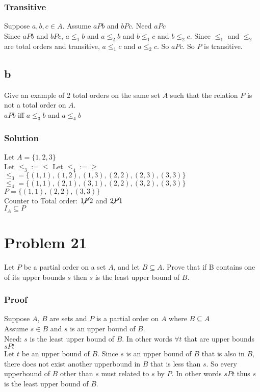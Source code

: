 \documentclass{article}
\begin{document}
\subsubsection*{Transitive}
Suppose $a,b,c \in A$.
Assume $aPb$ and $bPc$.
Need $aPc$\\
Since $aPb$ and $bPc$, $a\leq_1 b$ and $a\leq_2 b$ and $b\leq_1 c$ and $b\leq_2 c$. Since $\leq_1$ and $\leq_2$ are total orders and transitive, $a\leq_1 c$ and $a\leq_2 c$. So $aPc$. So $P$ is transitive.\\

\subsection*{b}
Give an example of 2 total orders on the same set $A$ such that the relation $P$ is not a total order on $A$.\\
$aPb$ iff $a\leq_3 b$ and $a\leq_4 b$\\
\subsubsection*{Solution}
Let $A = \{1,2,3\}$\\
Let $\leq_3 := \leq$
Let $\leq_4 := \geq$\\
$\leq_3 = \{ (1,1), (1,2), (1,3), (2,2), (2,3), (3,3) \}$\\
$\leq_4 = \{ (1,1), (2,1), (3,1), (2,2), (3,2), (3,3) \}$\\
$P = \{ (1,1), (2,2), (3,3)\}$\\
Counter to Total order: $1 \cancel{P} 2$ and $2 \cancel{P} 1$\\
$I_A \subseteq P$

\section*{Problem 21}
Let $P$ be a partial order on a set $A$, and let $B \subseteq A$. Prove that if B contains one of its upper bounds $s$ then $s$ is the least upper bound of $B$.
\subsubsection*{Proof}
Suppose $A$, $B$ are sets and $P$ is a partial order on $A$ where $B \subseteq A$\\
Assume $s \in B$ and $s$ is an upper bound of $B$.\\
Need: $s$ is the least upper bound of $B$. In other words $\forall t$ that are upper bounds $sPt$\\
Let $t$ be an upper bound of $B$. Since $s$ is an upper bound of $B$ that is also in $B$, there does not exist another upperbound in $B$ that is less than $s$. So every upperbound of $B$ other than $s$ must related to $s$ by $P$. In other words $sPt$ thus $s$ is the least upper bound of $B$.\\ 
\end{document}
